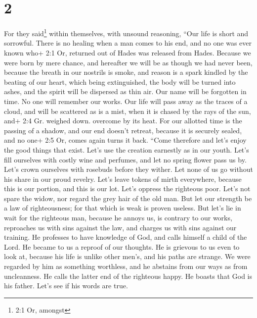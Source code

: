 \hypertarget{section-1}{%
\section{2}\label{section-1}}

 For they said\footnote{2:1 Or, amongst} within themselves,
with unsound reasoning, ``Our life is short and sorrowful. There is no
healing when a man comes to his end, and no one was ever known who+ 2:1
Or, returned out of Hades was released from Hades.  Because
we were born by mere chance, and hereafter we will be as though we had
never been, because the breath in our nostrils is smoke, and reason is a
spark kindled by the beating of our heart,  which being
extinguished, the body will be turned into ashes, and the spirit will be
dispersed as thin air.  Our name will be forgotten in time.
No one will remember our works. Our life will pass away as the traces of
a cloud, and will be scattered as is a mist, when it is chased by the
rays of the sun, and+ 2:4 Gr. weighed down. overcome by its heat.
 For our allotted time is the passing of a shadow, and our
end doesn't retreat, because it is securely sealed, and no one+ 2:5 Or,
comes again turns it back.  ``Come therefore and let's enjoy
the good things that exist. Let's use the creation earnestly as in our
youth.  Let's fill ourselves with costly wine and perfumes,
and let no spring flower pass us by.  Let's crown ourselves
with rosebuds before they wither.  Let none of us go without
his share in our proud revelry. Let's leave tokens of mirth everywhere,
because this is our portion, and this is our lot.  Let's
oppress the righteous poor. Let's not spare the widow, nor regard the
grey hair of the old man.  But let our strength be a law of
righteousness; for that which is weak is proven useless. 
But let's lie in wait for the righteous man, because he annoys us, is
contrary to our works, reproaches us with sins against the law, and
charges us with sins against our training.  He professes to
have knowledge of God, and calls himself a child of the Lord.
 He became to us a reproof of our thoughts. 
He is grievous to us even to look at, because his life is unlike other
men's, and his paths are strange.  We were regarded by him
as something worthless, and he abstains from our ways as from
uncleanness. He calls the latter end of the righteous happy. He boasts
that God is his father.  Let's see if his words are true.
